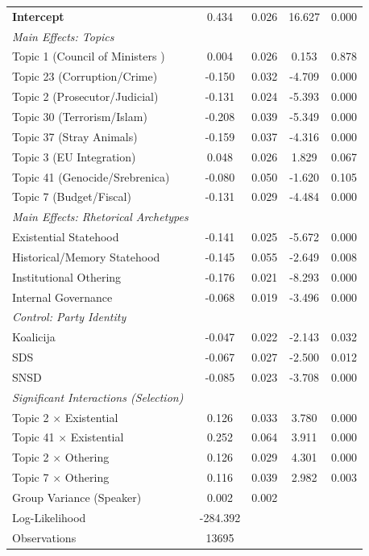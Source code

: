 \begin{longtable} {p{6.5cm} S[table-format=-1.3] S[table-format=1.3] S[table-format=-1.3] S[table-format=1.3]}
\textbf{Intercept} & 0.434 & 0.026 & 16.627 & 0.000 \\
\addlinespace
\textit{Main Effects: Topics} & & & & \\
Topic 1 (Council of Ministers ) & 0.004 & 0.026 & 0.153 & 0.878 \\
Topic 23 (Corruption/Crime) & -0.150 & 0.032 & -4.709 & 0.000 \\
Topic 2 (Prosecutor/Judicial) & -0.131 & 0.024 & -5.393 & 0.000 \\
Topic 30 (Terrorism/Islam) & -0.208 & 0.039 & -5.349 & 0.000 \\
Topic 37 (Stray Animals) & -0.159 & 0.037 & -4.316 & 0.000 \\
Topic 3 (EU Integration) & 0.048 & 0.026 & 1.829 & 0.067 \\
Topic 41 (Genocide/Srebrenica) & -0.080 & 0.050 & -1.620 & 0.105 \\
Topic 7 (Budget/Fiscal) & -0.131 & 0.029 & -4.484 & 0.000 \\
\addlinespace
\textit{Main Effects: Rhetorical Archetypes} & & & & \\
Existential Statehood & -0.141 & 0.025 & -5.672 & 0.000 \\
Historical/Memory Statehood & -0.145 & 0.055 & -2.649 & 0.008 \\
Institutional Othering & -0.176 & 0.021 & -8.293 & 0.000 \\
Internal Governance & -0.068 & 0.019 & -3.496 & 0.000 \\
\addlinespace
\textit{Control: Party Identity} & & & & \\
Koalicija & -0.047 & 0.022 & -2.143 & 0.032 \\
SDS & -0.067 & 0.027 & -2.500 & 0.012 \\
SNSD & -0.085 & 0.023 & -3.708 & 0.000 \\
\addlinespace
\textit{Significant Interactions (Selection)} & & & & \\
Topic 2 $\times$ Existential & 0.126 & 0.033 & 3.780 & 0.000 \\
Topic 41 $\times$ Existential & 0.252 & 0.064 & 3.911 & 0.000 \\
Topic 2 $\times$ Othering & 0.126 & 0.029 & 4.301 & 0.000 \\
Topic 7 $\times$ Othering & 0.116 & 0.039 & 2.982 & 0.003 \\
\addlinespace
\midrule
Group Variance (Speaker) & 0.002 & 0.002 & & \\
Log-Likelihood & -284.392 & & & \\
Observations & 13695 & & & \\
\end{longtable}



